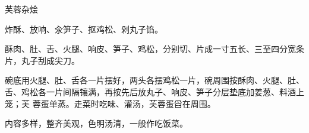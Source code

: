 \begin{recipe}{芙蓉杂烩}

\ingredients


\preparation

\step 炸酥、放响、汆笋子、抠鸡松、剁丸子馅。

\step 酥肉、肚、舌、火腿、响皮、笋子、鸡松，分别切、片成一寸五长、三至四分宽条
片，丸子刮成尖刀。

\step 碗底用火腿、肚、舌各一片摆好，两头各摆鸡松一片，碗周围按酥肉、火腿、肚、
舌、鸡松各一片间隔镶满，再按先后放丸子、响皮、笋子分层垫底加姜葱、料酒上笼；芙
蓉蛋单蒸。走菜时吃味、灌汤，芙蓉蛋舀在周围。

\features

内容多样，整齐美观，色明汤清，一般作吃饭菜。

\end{recipe}

